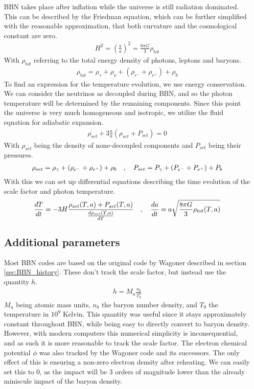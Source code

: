 BBN takes place after inflation while the universe is still radiation dominated. This can be described by the Friedman equation, which can be further simplified with the reasonable approximation, that both curvature and the cosmological constant are zero. 
\begin{align}
    H^2=\left(\frac{\dot{a}}{a}\right)^2=\frac{8\pi G}{3}\rho_{tot}
\end{align}
With $\rho_{tot}$ referring to the total energy density of photons, leptons and baryons.
\begin{align}
    \rho_{tot}=\rho_{\gamma}+\rho_{\nu}+(\rho_{e^-}+\rho_{e^+})+\rho_{b}
\end{align}
To find an expression for the temperature evolution, we use energy conservation. We can consider the neutrinos as decoupled during BBN, and so the photon temperature will be determined by the remaining components. Since this point the universe is very much homogeneous and isotropic, we utilize the fluid equation for adiabatic expansion. 
\begin{align}
    \dot{\rho_{set}}+3\frac{\dot{a}}{a}(\rho_{set} + P_{set})=0
\end{align}
With $\rho_{set}$ being the density of none-decoupled components and $P_{set}$ being their pressures.
\begin{align}
    \rho_{set}=\rho_{\gamma}+(\rho_{e^-}+\rho_{e^+})+\rho_{b}
    \quad , \quad P_{set}=P_{\gamma}+(P_{e^-}+P_{e^+})+P_{b}
\end{align}
With this we can set up differential equations describing the time evolution of the scale factor and photon temperature. 
\begin{align}
    \frac{dT}{dt}=-3H\frac{\rho_{set}(T,a) + P_{set}(T,a)}{\frac{d\rho_{set}(T,a)}{dT}} \quad , \quad \frac{da}{dt}=a\sqrt{\frac{8\pi G}{3}\rho_{tot}(T,a)}
    \label{eq:dBackground}
\end{align}

\subsection{Additional parameters}
Most BBN codes are based on the original code by Wagoner described in section \ref{sec:BBN_history}. These don't track the scale factor, but instead use the quantity $h$.
\begin{align}
    h=M_u\frac{n_{b}}{T^3_9}
\end{align}
$M_u$ being atomic mass units, $n_b$ the baryon number density, and  $T_9$ the temperature in $10^9$ Kelvin. This quantity was useful since it stays approximately constant throughout BBN, while being easy to directly convert to baryon density. However, with modern computers this numerical simplicity is inconsequential, and as such it is more reasonable to track the scale factor.
The electron chemical potential $\phi$ was also tracked by the Wagoner code and its successors. The only effect of this is ensuring a non-zero electron density after reheating. We can easily set this to 0, as the impact will be 3 orders of magnitude lower than the already miniscule impact of the baryon density.

